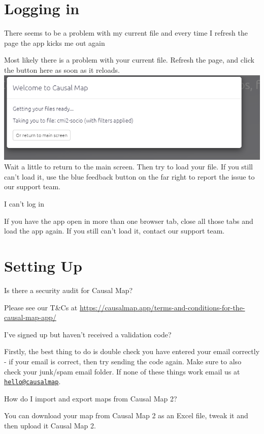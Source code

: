 \documentclass[
]{book}
\begin{document}
\hypertarget{logging-in}{%
\section{Logging in}\label{logging-in}}

There seems to be a problem with my current file and every time I refresh the page the app kicks me out again

Most likely there is a problem with your current file. Refresh the page, and click the button here as soon as it reloads.
\includegraphics{_assets/image-20211117201957585.png}
Wait a little to return to the main screen. Then try to load your file. If you still can't load it, use the blue feedback button on the far right to report the issue to our support team.

I can't log in

If you have the app open in more than one browser tab, close all those tabs and load the app again. If you still can't load it, contact our support team.

\hypertarget{setting-up}{%
\section{Setting Up}\label{setting-up}}

Is there a security audit for Causal Map?

Please see our T\&Cs at \url{https://causalmap.app/terms-and-conditions-for-the-causal-map-app/}

I've signed up but haven't received a validation code?

Firstly, the best thing to do is double check you have entered your email correctly - if your email is correct, then try sending the code again. Make sure to also check your junk/spam email folder. If none of these things work email us at \href{mailto:hello@causalmap}{\nolinkurl{hello@causalmap}}.

How do I import and export maps from Causal Map 2?

You can download your map from Causal Map 2 as an Excel file, tweak it and then upload it Causal Map 2.
\end{document}
